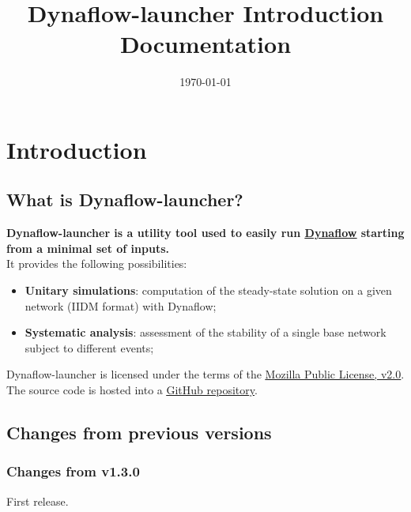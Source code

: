 \documentclass[a4paper, 12pt]{report}
\begin{document}
\title{Dynaflow-launcher Introduction Documentation}
\date\today

\maketitle
\tableofcontents

\chapter{Introduction}

\section{What is Dynaflow-launcher?}

\textbf{Dynaflow-launcher is a utility tool used to easily run \href{https://dynawo.github.io/about/dynaflow}{\underline{Dynaflow}}
starting from a minimal set of inputs.} \\

It provides the following possibilities:
\begin{itemize}
  \item \textbf{Unitary simulations}: computation of the steady-state solution on a given network (IIDM format) with Dynaflow;
  \item \textbf{Systematic analysis}: assessment of the stability of a single base network subject to different events;
\end{itemize}

Dynaflow-launcher is licensed under the terms of the \href{http://mozilla.org/MPL/2.0}{\underline{Mozilla Public License, v2.0}}.
The source code is hosted into a \href{https://github.com/dynawo/dynaflow-launcher} {\underline{GitHub repository}}. \\

\section{Changes from previous versions}

\subsection{Changes from v1.3.0}
First release.
\end{document}

